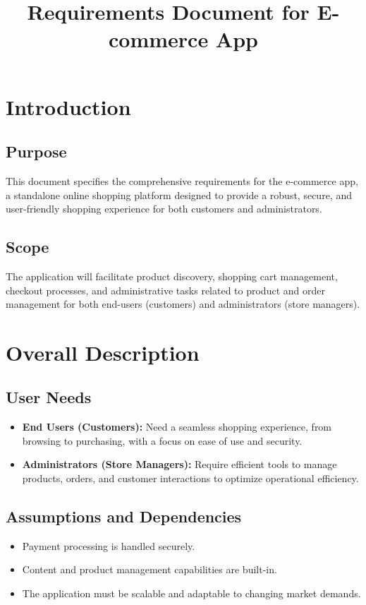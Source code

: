 \documentclass[11pt]{article}
\title{Requirements Document for E-commerce App}
\author{}
\begin{document}
	
	\maketitle
	
	\section*{Introduction}
	
	\subsection*{Purpose}
	This document specifies the comprehensive requirements for the e-commerce app, a standalone online shopping platform designed to provide a robust, secure, and user-friendly shopping experience for both customers and administrators.
	
	\subsection*{Scope}
	The application will facilitate product discovery, shopping cart management, checkout processes, and administrative tasks related to product and order management for both end-users (customers) and administrators (store managers).
	
	\section*{Overall Description}
	
	\subsection*{User Needs}
	\begin{itemize}
		\item \textbf{End Users (Customers):} Need a seamless shopping experience, from browsing to purchasing, with a focus on ease of use and security.
		\item \textbf{Administrators (Store Managers):} Require efficient tools to manage products, orders, and customer interactions to optimize operational efficiency.
	\end{itemize}
	
	\subsection*{Assumptions and Dependencies}
	\begin{itemize}
		\item Payment processing is handled securely.
		\item Content and product management capabilities are built-in.
		\item The application must be scalable and adaptable to changing market demands.
	\end{itemize}
	
\end{document}

